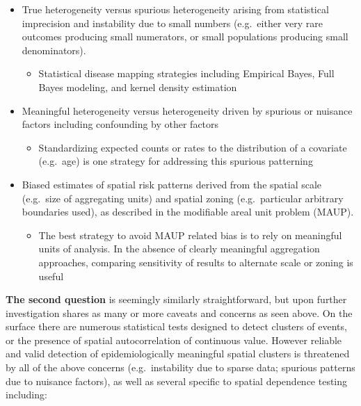 \documentclass[
]{book}
\providecommand{\tightlist}{%
  \setlength{\itemsep}{0pt}\setlength{\parskip}{0pt}}
\begin{document}
\begin{itemize}
\tightlist
\item
  True heterogeneity versus spurious heterogeneity arising from statistical imprecision and instability due to small numbers (e.g.~either very rare outcomes producing small numerators, or small populations producing small denominators).

  \begin{itemize}
  \tightlist
  \item
    Statistical disease mapping strategies including Empirical Bayes, Full Bayes modeling, and kernel density estimation
  \end{itemize}
\item
  Meaningful heterogeneity versus heterogeneity driven by spurious or nuisance factors including confounding by other factors

  \begin{itemize}
  \tightlist
  \item
    Standardizing expected counts or rates to the distribution of a covariate (e.g.~age) is one strategy for addressing this spurious patterning
  \end{itemize}
\item
  Biased estimates of spatial risk patterns derived from the spatial scale (e.g.~size of aggregating units) and spatial zoning (e.g.~particular arbitrary boundaries used), as described in the modifiable areal unit problem (MAUP).

  \begin{itemize}
  \tightlist
  \item
    The best strategy to avoid MAUP related bias is to rely on meaningful units of analysis. In the absence of clearly meaningful aggregation approaches, comparing sensitivity of results to alternate scale or zoning is useful
  \end{itemize}
\end{itemize}

\textbf{The second question} is seemingly similarly straightforward, but upon further investigation shares as many or more caveats and concerns as seen above. On the surface there are numerous statistical tests designed to detect clusters of events, or the presence of spatial autocorrelation of continuous value. However reliable and valid detection of epidemiologically meaningful spatial clusters is threatened by all of the above concerns (e.g.~instability due to sparse data; spurious patterns due to nuisance factors), as well as several specific to spatial dependence testing including:
\end{document}
